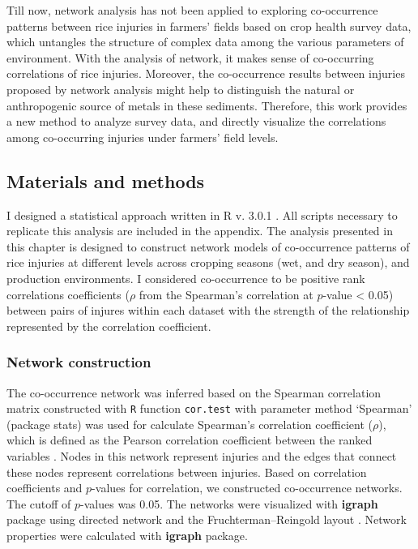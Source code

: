 Till now, network analysis has not been applied to exploring co-occurrence patterns between rice injuries in farmers’ fields based on crop health survey data, which untangles the structure of complex data among the various parameters of environment. With the analysis of network, it makes sense of co-occurring correlations of rice injuries. Moreover, the co-occurrence results between injuries proposed by network analysis might help to distinguish the natural or anthropogenic source of metals in these sediments. Therefore, this work provides a new method to analyze survey data, and directly visualize the correlations among co-occurring injuries under farmers’ field levels.

\subsection{Materials and methods} 

I designed a statistical approach written in R v. 3.0.1 \citep{R_2015}. All scripts necessary to replicate this analysis are included in the appendix. The analysis presented in this chapter is designed to construct network models of co-occurrence patterns of rice injuries at different levels across cropping seasons (wet, and dry season), and production environments. I considered co-occurrence to be positive rank correlations coefficients ($\rho$ from the Spearman’s correlation at $p$-value < 0.05) between pairs of injures within each dataset with the strength of the relationship represented by the correlation coefficient. 

\subsubsection{Network construction}

The co-occurrence network was inferred based on the Spearman correlation matrix constructed with \texttt{R} function \texttt{cor.test} with parameter method `Spearman' (package stats) was used for calculate Spearman's correlation coefficient ($\rho$), which is defined as the Pearson correlation coefficient between the ranked variables \citep{R_2015}. Nodes in this network represent injuries and the edges that connect these nodes represent correlations between injuries. Based on correlation coefficients and $p$-values for correlation, we constructed co-occurrence networks. The cutoff of $p$-values was 0.05.  The networks were visualized with \textbf{igraph} package \citep{Csardi_2010_igraph} using directed network and the Fruchterman–Reingold layout \citep{Fruchterman_1991_Graph}. Network properties were calculated with \textbf{igraph} package.

